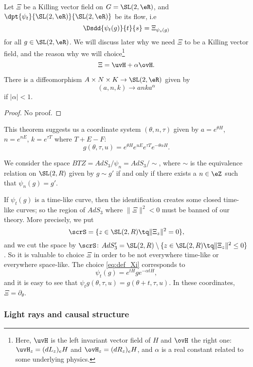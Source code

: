 Let $\Xi$ be a Killing vector field on $G=\SL(2,\eR)$, and $\dpt{\psi_t}{\SL(2,\eR)}{\SL(2,\eR)}$ be its flow, i.e
\[
	\Dsdd{\psi_t(g)}{t}{s}=\Xi_{\psi_s(g)}
\]
for all $g\in\SL(2,\eR)$. We will discuss later why we need $\Xi$ to be a Killing vector field, and the reason why we will choice\footnote{Here, $\uvH$ is the left invariant vector field of $H$ and $\ovH$ the right one: $\uvH_z=(dL_z)_eH$ and $\ovH_z=(dR_z)_eH$, and $\alpha$ is a real constant related to some underlying physics.}
\begin{equation}\label{eq:def_Xi}
	\Xi=\uvH+\alpha\ovH.
\end{equation}

\begin{theorem}
	There is a diffeomorphism $A\times N\times K\to \SL(2,\eR)$ given by
	\[
		(a,n,k)\to anka^{\alpha}
	\]
	if $|\alpha|< 1$.
\end{theorem}
\begin{proof}
	No proof.
\end{proof}

This theorem suggests us a coordinate system $(\theta,n,\tau)$ given by $a=e^{\theta H}$, $n=e^{n E}$, $k=e^{\tau T}$ where $T+E-F$:
\[
	g(\theta,\tau,u)=e^{\theta H}e^{uE}e^{\tau T}e^{-\theta\alpha H}.
\]

We consider the space $BTZ=AdS_3/\psi_n=AdS_3/\sim$, where $\sim$ is the equivalence relation on $\SL(2,R)$ given by $g\sim g'$ if and only if there exists a $n\in\eZ$ such that $\psi_n(g)=g'$.

If $\psi_t(g)$ is a time-like curve, then the identification creates some closed time-like curves; so the region of $AdS_3$ where $\|\Xi\|^2<0$ must be banned of our theory. More precisely, we put
\[
	\scrS=\{z\in\SL(2,R)\tq \|\Xi_z\|^2=0\},
\]
and we cut the space by $\scrS$: $AdS_3'=\SL(2,R)\setminus \{z\in\SL(2,R)\tq \|\Xi_z\|^2\leq 0\}$. So it is valuable to choice $\Xi$ in order to be not everywhere time-like or everywhere space-like. The choice \eqref{eq:def_Xi} corresponds to
\begin{equation}
	\psi_t(g)=e^{tH}ge^{-\alpha tH},
\end{equation}
and it is easy to see that $\psi_tg(\theta,\tau,u)=g(\theta+t,\tau,u)$. In these coordinates, $\Xi=\partial_{\theta}$.

\subsubsection{Light rays and causal structure}

